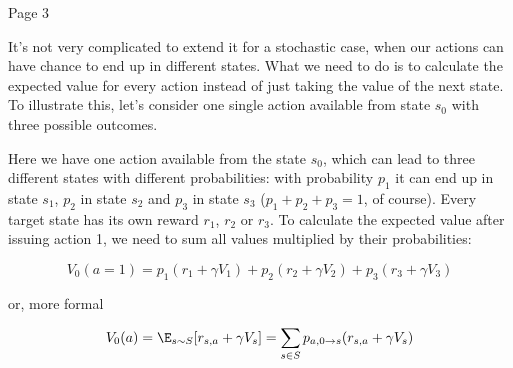 Page 3

It’s not very complicated to extend it for a stochastic case, when our
actions can have chance to end up in different states. What we need to do is to
calculate the expected value for every action instead of just taking the value
of the next state. To illustrate this, let’s consider one single action
available from state \begin{math}s_0\end{math} with three possible outcomes.

Here we have one action available from the state \begin{math}s_0\end{math}, which can lead to three
different states with different probabilities: with probability \begin{math}p_1\end{math} it can end up
in state \begin{math}s_1\end{math}, \begin{math}p_2\end{math} in state \begin{math}s_2\end{math} and
\begin{math}p_3\end{math} in state \begin{math}s_3\end{math} (\begin{math}p_1+p_2+p_3=1\end{math}, of course). Every
target state has its own reward \begin{math}r_1\end{math}, \begin{math}r_2\end{math} or \begin{math}r_3\end{math}. To calculate the expected value
after issuing action 1, we need to sum all values multiplied by their probabilities:


\begin{equation*}
  V_0(a=1) = p_1(r_1 + \gamma V_1) + p_2(r_2 + \gamma V_2) + p_3(r_3 + \gamma
  V_3)
\end{equation*}

or, more formal

\begin{equation*}
  V_0(a) = \E_{s \sim S}[r_{s,a} + \gamma V_s] = \sum_{s\in S} p_{a,0 \rightarrow s}(r_{s,a} + \gamma
  V_s)
\end{equation*}


